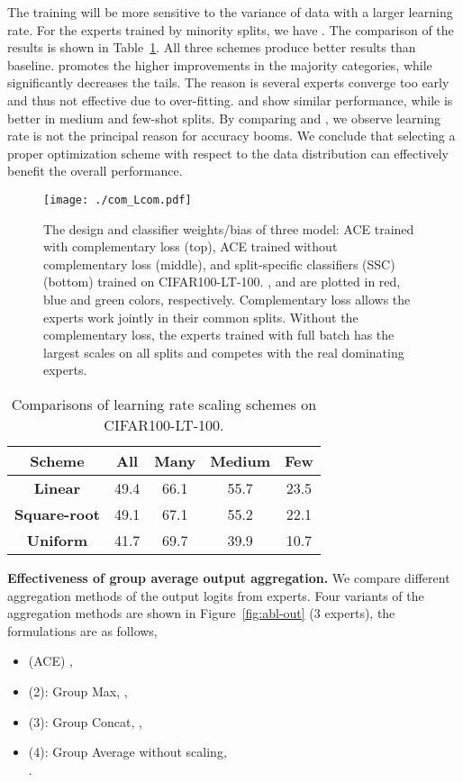 \documentclass[10pt,twocolumn,letterpaper]{article}
\begin{document}
The training will be more sensitive to the variance of data with a larger learning rate. For the experts trained by minority splits, we have . The comparison of the results is shown in Table~\ref{tab:abs-lr}. All three schemes produce better results than baseline.  promotes the higher improvements in the majority categories, while significantly decreases the tails. The reason is several experts converge too early and thus not effective due to over-fitting.  and  show similar performance, while  is better in medium and few-shot splits. By comparing  and , we observe learning rate is not the principal reason for accuracy booms. We conclude that selecting a proper optimization scheme with respect to the data distribution can effectively benefit the overall performance.
\begin{figure*}[t]
\begin{center}
\texttt{[image: ./com\_Lcom.pdf]}
\end{center}
   \caption{The design and classifier weights/bias of three model: ACE trained with complementary loss (top), ACE trained without complementary loss (middle), and split-specific classifiers (SSC) (bottom) trained on CIFAR100-LT-100. ,  and  are plotted in red, blue and green colors, respectively. Complementary loss allows the experts work jointly in their common splits. Without the complementary loss, the experts trained with full batch has the largest scales on all splits and competes with the real dominating experts.}
\label{fig:abl-comloss}
\end{figure*}

\begin{table}[h]
\begin{center}
\small
\begin{tabular}{c|c|c c c}
\toprule[1.5pt]
\textbf{Scheme} &  \textbf{All} & \textbf{Many} & \textbf{Medium} & \textbf{Few}\\\hline\hline
 \textbf{Linear} &  49.4 & 66.1 & 55.7 & 23.5\\
\textbf{Square-root} &  49.1 & 67.1 & 55.2 & 22.1 \\
\textbf{Uniform}   & 41.7 &  69.7 & 39.9 & 10.7\\
\bottomrule[1.5pt]
\end{tabular}
\end{center}
\caption{Comparisons of learning rate scaling schemes on CIFAR100-LT-100.}
\label{tab:abs-lr}
\end{table}

\textbf{Effectiveness of group average output aggregation.} We compare different aggregation methods of the output logits  from  experts. Four variants of the aggregation methods are shown in Figure~\ref{fig:abl-out} (3 experts), the formulations are as follows,
\begin{itemize}
    \item (ACE) ,
    \item (2): Group Max, ,
    \item (3): Group Concat, ,
    \item (4): Group Average without scaling,\\ .
\end{itemize}
\end{document}
